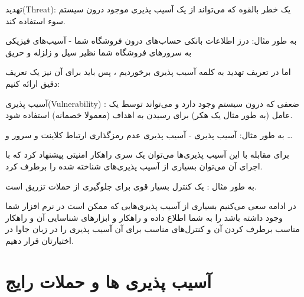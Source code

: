 \documentclass[]{article}
\begin{document}
تهدید(Threat): یک خطر بالقوه که می‌تواند از یک آسیب پذیری موجود درون سیستم سوء استفاده کند.

به طور مثال: درز اطلاعات بانکی حساب‌های درون فروشگاه شما  - آسیب‌های فیزیکی به سرور‌های فروشگاه شما نظیر سیل و زلزله و حریق 

اما در تعریف تهدید به کلمه آسیب پذیری برخوردیم ، پس باید برای آن نیز یک تعریف دقیق ارائه   کنیم:


\bigskip
آسیب پذیری(Vulnerability) : ضعفی که درون سیستم وجود دارد و می‌تواند توسط یک عامل (به طور مثال یک هکر) برای رسیدن به اهداف (معمولا خصمانه) استفاده شود.

به طور مثال: آسیب پذیری    - آسیب پذیری عدم رمزگذاری ارتباط کلاینت و سرور و …

برای مقابله با این آسیب پذیری‌ها می‌توان یک سری راهکار امنیتی پیشنهاد کرد که با اجرای آن می‌توان بسیاری از آسیب پذیری‌های شناخته شده را برطرف کرد.

به طور مثال :  یک کنترل بسیار قوی برای جلوگیری از حملات تزریق است. 

\bigskip

در ادامه سعی می‌کنیم بسیاری از آسیب پذیری‌هایی که ممکن است در نرم افزار شما وجود داشته باشد را به شما اطلاع داده و راهکار و ابزار‌های شناسایی آن و راهکار مناسب برطرف کردن آن و کنترل‌های مناسب برای آن آسیب پذیری را در زبان جاوا در اختیارتان قرار دهیم.

\newpage

\section*{{\titr آسیب پذیری ها و حملات رایج}}

\end{document}
